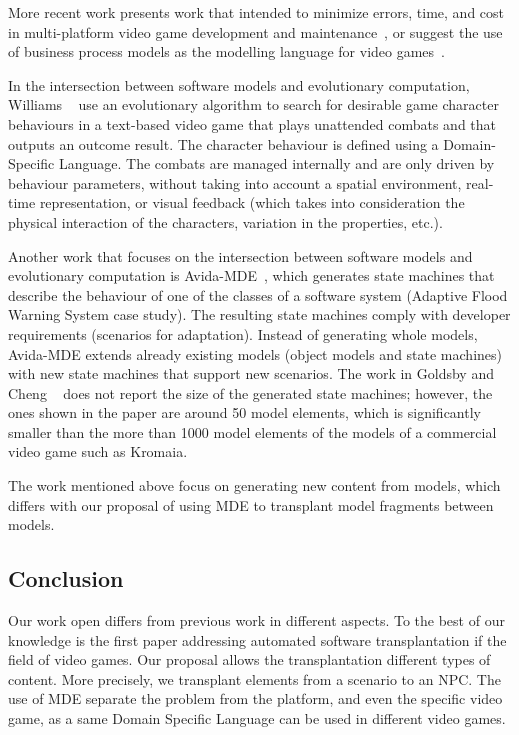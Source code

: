 More recent work presents work that intended to minimize errors, time, and cost in multi-platform video game development and maintenance~\cite{Nunez17,Nunez13,Usman17}, or suggest the use of business process models as the modelling language for video games~\cite{Solis15}.

In the intersection between software models and evolutionary computation, Williams \etal~\cite{Williams11} use an evolutionary algorithm to search for desirable game character behaviours in a text-based video game that plays unattended combats and that outputs an outcome result. The character behaviour is defined using a Domain-Specific Language. The combats are managed internally and are only driven by behaviour parameters, without taking into account a spatial environment, real-time representation, or visual feedback (which takes into consideration the physical interaction of the characters, variation in the properties, etc.).

Another work that focuses on the intersection between software models and evolutionary computation is Avida-MDE~\cite{Goldsby2008}, which generates state machines that describe the behaviour of one of the classes of a software system
(Adaptive Flood Warning System case study). The resulting state machines comply with developer requirements (scenarios for
adaptation). Instead of generating whole models, Avida-MDE extends already existing models (object models and state machines) with new state machines that support new scenarios. The work in Goldsby and Cheng \etal~\cite{Goldsby2008} does not report the size of the generated state machines; however, the ones shown in the paper are around 50 model elements, which is significantly smaller than the more than 1000 model elements of the models of a commercial video game such as Kromaia.

The work mentioned above focus on generating new content from models, which differs with our proposal of using MDE to transplant model fragments between models.

\subsection{Conclusion}

Our work open differs from previous work in different aspects. 
To the best of our knowledge is the first paper addressing automated software transplantation if the field of video games. Our proposal allows the transplantation different types of content. More precisely, we transplant elements from a scenario to an NPC. The use of MDE separate the problem from the platform, and even the specific video game, as a same Domain Specific Language can be used in different video games.
